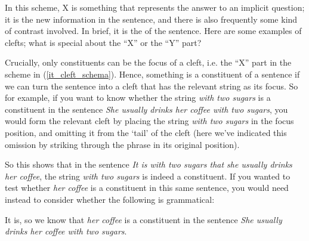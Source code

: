 \documentclass{article}
\begin{document}
In this scheme, X is something that represents the answer to an implicit question; it is the new information in the sentence, and there is also frequently some kind of contrast involved.
In brief, it is the  of the sentence.
Here are some examples of clefts; what is special about the ``X'' or the ``Y'' part?
\begin{exe}
\end{exe}

Crucially, only constituents can be the focus of a cleft, i.e. the ``X'' part in the scheme in (\ref{it_cleft_schema}).
Hence, something is a constituent of a sentence if we can turn the sentence into a cleft that has the relevant string as its focus.
So for example, if you want to know whether the string \emph{with two sugars} is a constituent in the sentence \emph{She usually drinks her coffee with two sugars}, you would form the relevant cleft by placing the string \emph{with two sugars} in the focus position, and omitting it from the `tail' of the cleft (here we've indicated this omission by striking through the phrase in its original position).
\begin{exe}
\end{exe}
So this shows that in the sentence \emph{It is with two sugars that she usually drinks her coffee}, the string \emph{with two sugars} is indeed a constituent.
If you wanted to test whether \emph{her coffee} is a constituent in this same sentence, you would need instead to consider whether the following is grammatical:
\begin{exe}
\end{exe}

It is, so we know that \emph{her coffee} is a constituent in the sentence \emph{She usually drinks her coffee with two sugars}. 
\end{document}
